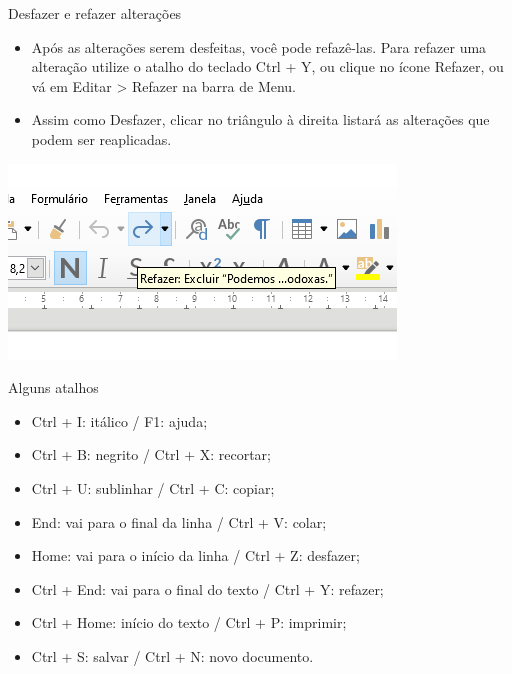 \begin{frame}{Desfazer e refazer alterações}
	\begin{block}{}
		\begin{itemize}
			\item Após as alterações serem desfeitas, você pode refazê-las. Para refazer uma alteração utilize o atalho do teclado Ctrl + Y, ou clique no ícone Refazer, ou vá em Editar > Refazer na barra de Menu.
			\item Assim como Desfazer, clicar no triângulo à direita listará as alterações que podem ser reaplicadas.
		\end{itemize}
	\end{block}

	\centering
	\includegraphics[width=0.7\linewidth]{Figuras/Ch04/fig40}
\end{frame}


\begin{frame}{Alguns atalhos}
	\begin{block}{}
		\begin{itemize}
			\item Ctrl + I: itálico / F1: ajuda;
			\item Ctrl + B: negrito / Ctrl + X: recortar;
			\item Ctrl + U: sublinhar / Ctrl + C: copiar;
			\item End: vai para o final da linha / Ctrl + V: colar;
			\item Home: vai para o início da linha / Ctrl + Z: desfazer;
			\item Ctrl + End: vai para o final do texto / Ctrl + Y: refazer;
			\item Ctrl + Home: início do texto / Ctrl + P: imprimir;
			\item Ctrl + S: salvar / Ctrl + N: novo documento.
		\end{itemize}
	\end{block}

\end{frame}


